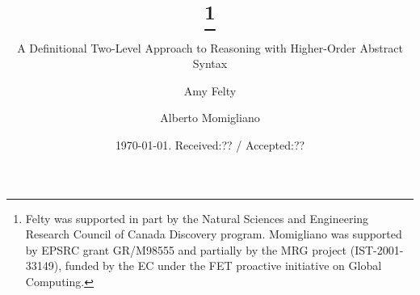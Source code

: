 \documentclass[final]{svjour3}
\begin{document}
\title{\hybrid\thanks{Felty was supported in part by the Natural
  Sciences and Engineering Research Council of Canada Discovery program.
  Momigliano was
  supported by EPSRC grant GR/M98555 
and partially by the MRG project (IST-2001-33149),
  funded by the EC under the FET proactive initiative on Global
  Computing.}} \subtitle{A Definitional Two-Level Approach to Reasoning
  with Higher-Order Abstract Syntax}

\author{Amy Felty \and Alberto Momigliano}
         


\date{\today. Received:?? / Accepted:??}





\maketitle
\end{document}
